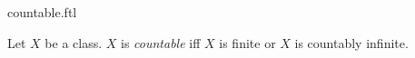 \documentclass{stex}
\begin{document}
\begin{smodule}{countable.ftl}


\begin{definition}[forthel,id=CountDef]
  Let $X$ be a class.
  $X$ is \emph{countable} iff $X$ is finite or $X$ is countably infinite.
\end{definition}

\end{smodule}
\end{document}
